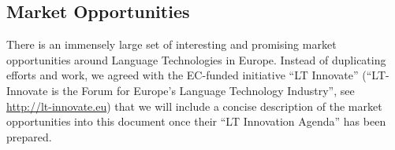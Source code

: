 \documentclass[10pt, plain]{../../metanetpaper}
\begin{document}
\begin{multicols}{2}
\subsection{Market Opportunities}
\label{sec:lang-techn-industry}

There is an immensely large set of interesting and promising market opportunities around Language Technologies in Europe. Instead of duplicating efforts and work, we agreed with the EC-funded initiative ``LT Innovate'' (``LT-Innovate is the Forum for Europe's Language Technology Industry'', see \url{http://lt-innovate.eu}) that we will include a concise description of the market opportunities into this document once their ``LT Innovation Agenda'' has been prepared.
\end{multicols}

\clearpage
\end{document}
